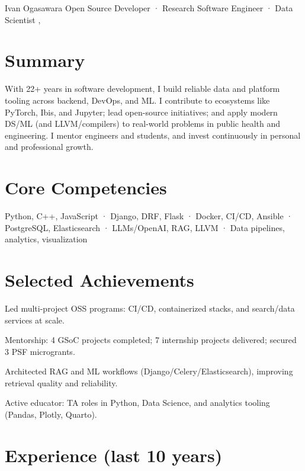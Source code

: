 \documentclass[10pt,a4paper]{article}
\begin{document}
\begin{cvheader}
  {Ivan Ogasawara}
  {Open Source Developer · Research Software Engineer · Data Scientist}
  {
     \sep
  }
\end{cvheader}

\section{Summary}
With 22+ years in software development, I build reliable data and platform tooling across backend, DevOps, and ML. I contribute to ecosystems like PyTorch, Ibis, and Jupyter; lead open-source initiatives; and apply modern DS/ML (and LLVM/compilers) to real-world problems in public health and engineering. I mentor engineers and students, and invest continuously in personal and professional growth.

\section{Core Competencies}
Python, C++, JavaScript · Django, DRF, Flask · Docker, CI/CD, Ansible · PostgreSQL, Elasticsearch ·
LLMs/OpenAI, RAG, LLVM · Data pipelines, analytics, visualization

\section{Selected Achievements}
\begin{tightitemize}
  \item Led multi-project OSS programs: CI/CD, containerized stacks, and search/data services at scale.
  \item Mentorship: 4 GSoC projects completed; 7 internship projects delivered; secured 3 PSF microgrants.
  \item Architected RAG and ML workflows (Django/Celery/Elasticsearch), improving retrieval quality and reliability.
  \item Active educator: TA roles in Python, Data Science, and analytics tooling (Pandas, Plotly, Quarto).
\end{tightitemize}

\section{Experience (last 10 years)}
\end{document}
